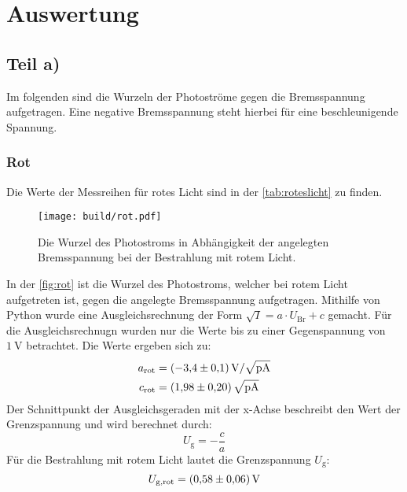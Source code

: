 \section{Auswertung}
\label{sec:Auswertung}
\subsection{Teil a)}
Im folgenden sind die Wurzeln der Photoströme gegen die Bremsspannung aufgetragen. 
Eine negative Bremsspannung steht hierbei für eine beschleunigende Spannung.
\subsubsection{Rot}
Die Werte der Messreihen für rotes Licht sind in der \autoref{tab:roteslicht} zu finden. 
\begin{figure}[H]
  \centering
  \texttt{[image: build/rot.pdf]}
  \caption{Die Wurzel des Photostroms in Abhängigkeit der angelegten Bremsspannung bei der Bestrahlung mit rotem Licht.}
  \label{fig:rot}
\end{figure}
\noindent
In der \autoref{fig:rot} ist die Wurzel des Photostroms, welcher bei rotem Licht aufgetreten ist, gegen die angelegte Bremsspannung aufgetragen.
Mithilfe von Python wurde eine Ausgleichsrechnung der Form $\sqrt{I} = a \cdot U_{\text{Br}} + c $ gemacht.
Für die Ausgleichsrechnugn wurden nur die Werte bis zu einer Gegenspannung von $\SI{1}{\volt}$ betrachtet.
Die Werte ergeben sich zu:
\begin{align*}
  a_{\text{rot}} &= \SI{-3.4 \pm 0.1}{\volt\per\sqrt{\pico\ampere}}\\
  c_{\text{rot}} &= \SI{1.98 \pm 0.2}{\sqrt{\pico\ampere}}
\end{align*}
Der Schnittpunkt der Ausgleichsgeraden mit der x-Achse beschreibt den Wert der Grenzspannung und wird berechnet durch:
\begin{equation}\label{eqn:U_G}
  U_{\text{g}}=-\frac{c}{a}
\end{equation}
Für die Bestrahlung mit rotem Licht lautet die Grenzspannung $U_{\text{g}}$:
\begin{equation*}
  U_{\text{g},\text{rot}} = \SI{0.58\pm0.06}{\volt}
\end{equation*}

